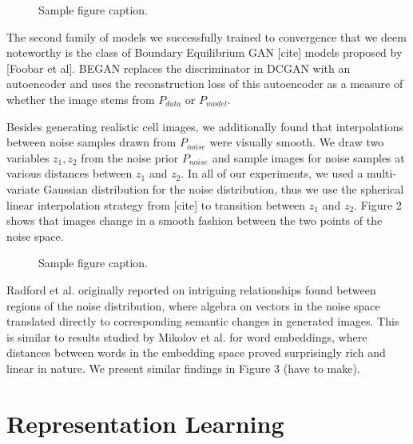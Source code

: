 \documentclass{article}
\begin{document}
\begin{figure}[h]
  \centering
  \fbox{\rule[-.5cm]{0cm}{4cm} \rule[-.5cm]{4cm}{0cm}}
  \caption{Sample figure caption.}
\end{figure}


The second family of models we successfully trained to convergence that we deem noteworthy is the class of Boundary Equilibrium GAN [cite] models proposed by [Foobar et al]. BEGAN replaces the discriminator in DCGAN with an autoencoder and uses the reconstruction loss of this autoencoder as a measure of whether the image stems from $P_{data}$ or $P_{model}$. %

Besides generating realistic cell images, we additionally found that interpolations between noise samples drawn from $P_{noise}$ were visually smooth. We draw two variables $z_1, z_2$ from the noise prior $P_{noise}$ and sample images for noise samples at various distances between $z_1$ and $z_2$. In all of our experiments, we used a multi-variate Gaussian distribution for the noise distribution, thus we use the spherical linear interpolation strategy from [cite] to transition between $z_1$ and $z_2$. Figure 2 shows that images change in a smooth fashion between the two points of the noise space.

\begin{figure}[h]
  \centering
  \fbox{\rule[-.5cm]{0cm}{4cm} \rule[-.5cm]{4cm}{0cm}}
  \caption{Sample figure caption.}
\end{figure}

Radford et al. originally reported on intriguing relationships found between regions of the noise distribution, where algebra on vectors in the noise space translated directly to corresponding semantic changes in generated images. This is similar to results studied by Mikolov et al. for word embeddings, where distances between words in the embedding space proved surprisingly rich and linear in nature. We present similar findings in Figure 3 (have to make).


\section{Representation Learning}
\end{document}
